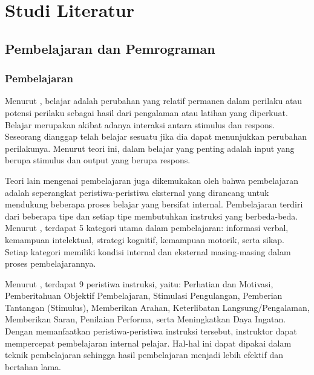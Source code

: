 \chapter{Studi Literatur}

\section{Pembelajaran dan Pemrograman}
\subsection{Pembelajaran}
Menurut \textcite{slavin2017learn}, belajar adalah perubahan yang relatif permanen dalam perilaku atau potensi perilaku sebagai hasil dari pengalaman atau latihan yang diperkuat. Belajar merupakan akibat adanya interaksi antara stimulus dan respons. Seseorang dianggap telah belajar sesuatu jika dia dapat menunjukkan perubahan perilakunya. Menurut teori ini, dalam belajar yang penting adalah input yang berupa stimulus dan output yang berupa respons.

Teori lain mengenai pembelajaran juga dikemukakan oleh \textcite{gagne1970learning} bahwa pembelajaran adalah seperangkat peristiwa-peristiwa eksternal yang dirancang untuk mendukung beberapa proses belajar yang bersifat internal. Pembelajaran terdiri dari beberapa tipe dan setiap tipe membutuhkan instruksi yang berbeda-beda. Menurut \textcite{gagne1970learning}, terdapat 5 kategori utama dalam pembelajaran: informasi verbal, kemampuan intelektual, strategi kognitif, kemampuan motorik, serta sikap. Setiap kategori memiliki kondisi internal dan eksternal masing-masing dalam proses pembelajarannya.

Menurut \textcite{gagne1985learning}, terdapat 9 peristiwa instruksi, yaitu: Perhatian dan Motivasi, Pemberitahuan Objektif Pembelajaran, Stimulasi Pengulangan, Pemberian Tantangan (Stimulus), Memberikan Arahan, Keterlibatan Langsung/Pengalaman, Memberikan Saran, Penilaian Performa, serta Meningkatkan Daya Ingatan. Dengan memanfaatkan peristiwa-peristiwa instruksi tersebut, instruktor dapat mempercepat pembelajaran internal pelajar. Hal-hal ini dapat dipakai dalam teknik pembelajaran sehingga hasil pembelajaran menjadi lebih efektif dan bertahan lama.

